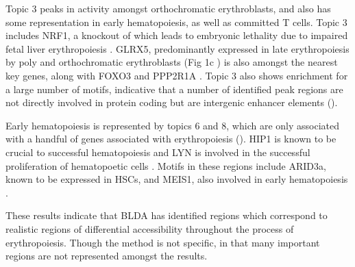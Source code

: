 Topic 3 peaks in activity amongst orthochromatic erythroblasts, and also has some representation in early hematopoiesis, as well as committed T cells. Topic 3 includes NRF1, a knockout of which leads to embryonic lethality due to impaired fetal liver erythropoiesis \cite{Chen2001}. GLRX5, predominantly expressed in late erythropoiesis by poly and orthochromatic erythroblasts (Fig 1c \cite{Pishesha2014}) is also amongst the nearest key genes, along with FOXO3 and PPP2R1A \cite{Mello2019}. Topic 3 also shows enrichment for a large number of motifs, indicative that a number of identified peak regions are not directly involved in protein coding but are intergenic enhancer elements ().

Early hematopoiesis is represented by topics 6 and 8, which are only associated with a handful of genes associated with erythropoiesis (). HIP1 is known to be crucial to successful hematopoiesis and LYN is involved in the successful proliferation of hematopoetic cells \cite{Oravecz-Wilson2004, OLaughlin-Bunner2001}. Motifs in these regions include ARID3a, known to be expressed in HSCs, and MEIS1, also involved in early hematopoiesis \cite{Zeddies2014,Miller2016, Ratliff2020}. 

These results indicate that BLDA has identified regions which correspond to realistic regions of differential accessibility throughout the process of erythropoiesis. Though the method is not specific, in that many important regions are not represented amongst the results.  











